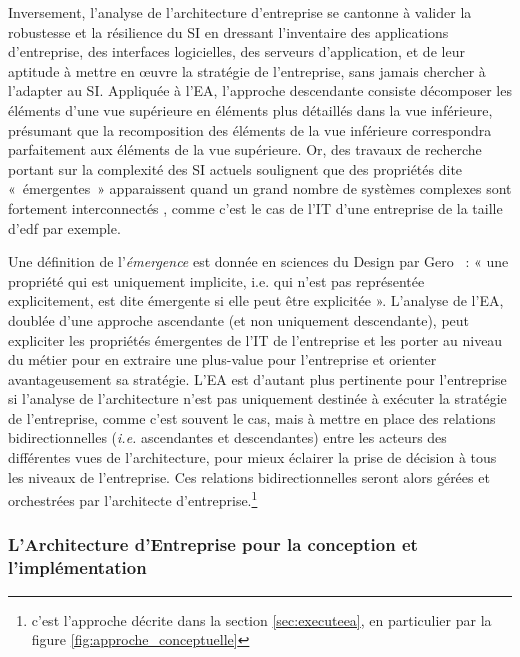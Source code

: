 Inversement, l'analyse de l'architecture d'entreprise se cantonne à valider la
robustesse et la résilience du SI en dressant l'inventaire des applications
d'entreprise, des interfaces logicielles, des serveurs d'application, et de
leur aptitude à mettre en œuvre la stratégie de l'entreprise, sans jamais
chercher à l'adapter au SI. Appliquée à l'EA, l'approche descendante consiste
décomposer les éléments d'une vue supérieure en éléments plus détaillés dans la
vue inférieure, présumant que la recomposition des éléments de la vue
inférieure correspondra parfaitement aux éléments de la vue supérieure. Or, des
travaux de recherche portant sur la complexité des SI actuels soulignent que
des propriétés dite «~émergentes~» apparaissent quand un grand nombre de
systèmes complexes sont fortement interconnectés \cite{bullock2004complexity},
comme c'est le cas de l'IT d'une entreprise de la taille d'\gls{edf} par
exemple.

Une définition de l'\textit{émergence} est donnée en sciences du Design par
Gero \cite{gero1992creativity}~: « une propriété qui est uniquement implicite,
i.e.  qui n'est pas représentée explicitement, est dite émergente si elle peut
être explicitée ». L'analyse de l'EA, doublée d'une approche ascendante (et non
uniquement descendante), peut expliciter les propriétés émergentes de l'IT de
l'entreprise et les porter au niveau du métier pour en extraire une plus-value
pour l'entreprise et orienter avantageusement sa stratégie. L'EA est d'autant
plus pertinente pour l'entreprise si l'analyse de l'architecture n'est pas
uniquement destinée à exécuter la stratégie de l'entreprise, comme c'est
souvent le cas, mais à mettre en place des relations bidirectionnelles
(\textit{i.e.} ascendantes et descendantes) entre les acteurs des différentes
vues de l'architecture, pour mieux éclairer la prise de décision à tous les
niveaux de l'entreprise. Ces relations bidirectionnelles seront alors gérées et
orchestrées par l'architecte d'entreprise.\footnote{c'est l'approche décrite dans la section \ref{sec:executeea}, en particulier par la figure \ref{fig:approche_conceptuelle}}


\subsubsection{L'Architecture d'Entreprise pour la conception et l'implémentation}

